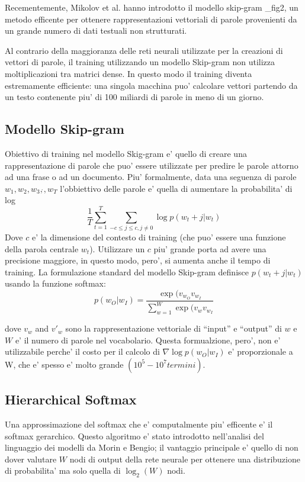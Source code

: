 \documentclass[a4paper,11pt]{book}
\theoremstyle{definition}
\begin{document}
Recementemente, Mikolov et al. hanno introdotto il modello skip-gram \_fig2, un metodo efficente per ottenere
rappresentazioni vettoriali di parole provenienti da un grande numero di dati testuali non strutturati.


Al contrario della maggioranza delle reti neurali utilizzate per la creazioni di vettori di parole, 
il training utilizzando un modello Skip-gram non utilizza moltiplicazioni tra matrici dense.
In questo modo il training diventa estremamente efficiente: una singola macchina puo' calcolare vettori
partendo da un testo contenente piu' di 100 miliardi di parole in meno di un giorno.

\subsection{Modello Skip-gram}
Obiettivo di training nel modello Skig-gram e' quello di creare una rappresentazione di parole che
puo' essere utilizzate per predire le parole attorno ad una frase o ad un documento. Piu' formalmente,
data una seguenza di parole $w_1,w_2,w_3,\dot{},w_T$ l'obbiettivo delle parole e' quella di aumentare la
probabilita' di log
\begin{equation}
	\frac{1}{T} \sum_{t=1}^{T} \sum_{-c\leq j\leq c,j\neq0} \log p(w_t+j|w_t)
	\label{eq:prob log}
\end{equation}
Dove $c$ e' la dimensione del contesto di training (che puo' essere una funzione della parola centrale $w_t$).
Utilizzare un $c$ piu' grande porta ad avere una precisione maggiore, in questo modo, pero', si aumenta anche il 
tempo di training. La formulazione standard del modello Skip-gram definisce $p(w_t+j|w_t)$ usando la funzione
softmax:
\begin{equation}
	p(w_O|w_I) = \frac{\exp(v_{w_O} v_{w_I}}{\sum_{w=1}^{W}\exp(v_w v_{w_I}}
	\label{eq:softmax}
\end{equation}

dove $v_w$ and $v'_w$ sono la rappresentazione vettoriale di ``input'' e ``output'' di $w$ e $W$ e' il numero
di parole nel vocabolario.
Questa formualzione, pero', non e' utilizzabile perche' il costo per il calcolo di $\nabla\log p(w_O|w_I)$
e' proporzionale a W, che e' spesso e' molto grande $(10^5-10^7 termini)$.

\subsection{Hierarchical Softmax}
Una approssimazione del softmax che e' computalmente piu' efficente e' il softmax gerarchico. Questo algoritmo
e' stato introdotto nell'analisi del linguaggio dei modelli da Morin e Bengio; il vantaggio principale
e' quello di non dover valutare $W$ nodi di output della rete neurale per ottenere una distribuzione
di probabilita' ma solo quella di $\log_2(W)$ nodi.
\end{document}
